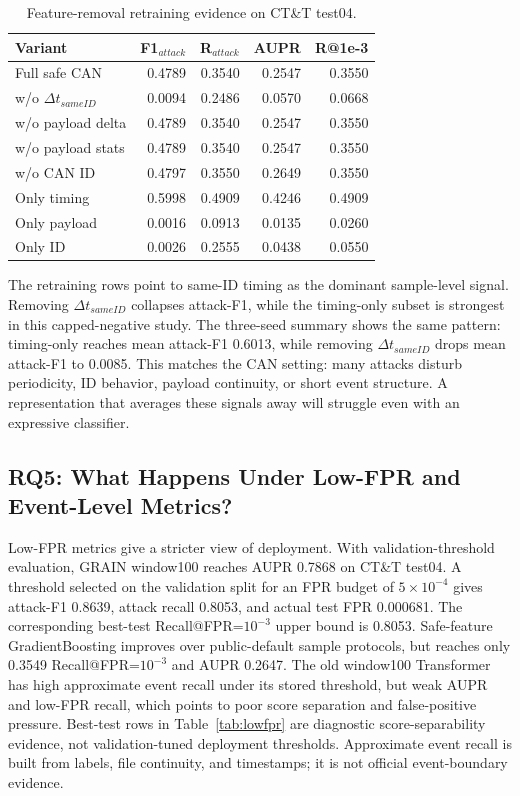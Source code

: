 \documentclass[runningheads]{llncs}
\newcommand{\attf}{F1$_{attack}$}
\newcommand{\ratt}{R$_{attack}$}
\begin{document}
\begin{table}[!htbp]
\caption{Feature-removal retraining evidence on CT\&T test04.}
\label{tab:mechanism}
\centering
\small
\begin{tabular*}{0.98\textwidth}{@{\extracolsep{\fill}}lrrrr@{}}
\hline
Variant & \attf & \ratt & AUPR & R@1e-3 \\
\hline
Full safe CAN & 0.4789 & 0.3540 & 0.2547 & 0.3550 \\
w/o $\Delta t_{sameID}$ & 0.0094 & 0.2486 & 0.0570 & 0.0668 \\
w/o payload delta & 0.4789 & 0.3540 & 0.2547 & 0.3550 \\
w/o payload stats & 0.4789 & 0.3540 & 0.2547 & 0.3550 \\
w/o CAN ID & 0.4797 & 0.3550 & 0.2649 & 0.3550 \\
Only timing & 0.5998 & 0.4909 & 0.4246 & 0.4909 \\
Only payload & 0.0016 & 0.0913 & 0.0135 & 0.0260 \\
Only ID & 0.0026 & 0.2555 & 0.0438 & 0.0550 \\
\hline
\end{tabular*}
\end{table}

The retraining rows point to same-ID timing as the dominant sample-level signal.  Removing $\Delta t_{sameID}$ collapses attack-F1, while the timing-only subset is strongest in this capped-negative study.  The three-seed summary shows the same pattern: timing-only reaches mean attack-F1 0.6013, while removing $\Delta t_{sameID}$ drops mean attack-F1 to 0.0085.  This matches the CAN setting: many attacks disturb periodicity, ID behavior, payload continuity, or short event structure.  A representation that averages these signals away will struggle even with an expressive classifier.

\subsection{RQ5: What Happens Under Low-FPR and Event-Level Metrics?}
Low-FPR metrics give a stricter view of deployment.  With validation-threshold evaluation, GRAIN window100 reaches AUPR 0.7868 on CT\&T test04.  A threshold selected on the validation split for an FPR budget of $5\times10^{-4}$ gives attack-F1 0.8639, attack recall 0.8053, and actual test FPR 0.000681.  The corresponding best-test Recall@FPR=$10^{-3}$ upper bound is 0.8053.  Safe-feature GradientBoosting improves over public-default sample protocols, but reaches only 0.3549 Recall@FPR=$10^{-3}$ and AUPR 0.2647.  The old window100 Transformer has high approximate event recall under its stored threshold, but weak AUPR and low-FPR recall, which points to poor score separation and false-positive pressure.  Best-test rows in Table~\ref{tab:lowfpr} are diagnostic score-separability evidence, not validation-tuned deployment thresholds.  Approximate event recall is built from labels, file continuity, and timestamps; it is not official event-boundary evidence.
\end{document}
